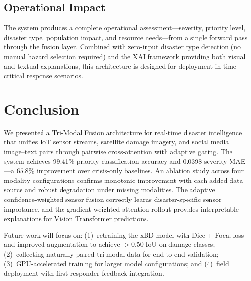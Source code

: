 \documentclass[journal]{IEEEtran}
\begin{document}
\subsection{Operational Impact}

The system produces a complete operational assessment---severity, priority level, disaster type, population impact, and resource needs---from a single forward pass through the fusion layer. Combined with zero-input disaster type detection (no manual hazard selection required) and the XAI framework providing both visual and textual explanations, this architecture is designed for deployment in time-critical response scenarios.

\section{Conclusion}

We presented a Tri-Modal Fusion architecture for real-time disaster intelligence that unifies IoT sensor streams, satellite damage imagery, and social media image--text pairs through pairwise cross-attention with adaptive gating. The system achieves 99.41\% priority classification accuracy and 0.0398 severity MAE---a 65.8\% improvement over crisis-only baselines. An ablation study across four modality configurations confirms monotonic improvement with each added data source and robust degradation under missing modalities. The adaptive confidence-weighted sensor fusion correctly learns disaster-specific sensor importance, and the gradient-weighted attention rollout provides interpretable explanations for Vision Transformer predictions.

Future work will focus on: (1)~retraining the xBD model with Dice + Focal loss and improved augmentation to achieve $>$0.50 IoU on damage classes; (2)~collecting naturally paired tri-modal data for end-to-end validation; (3)~GPU-accelerated training for larger model configurations; and (4)~field deployment with first-responder feedback integration.
\end{document}
